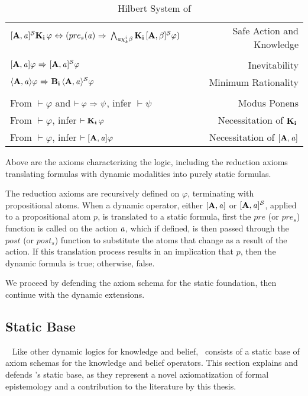 \begin{table}[H]
\begin{center}
\begin{tabular}{| l r |}
    $\mathbf{[A,\mathit{a}]^\mathcal{S}}\mathbf{K}_{\mathbf{i}}\,\varphi {\ \Leftrightarrow \ } (pre_s(\mathit{a}){\ \Rightarrow \ } \bigwedge_{\mathit{a}\chi_{k}^i\beta}\mathbf{K}_{\mathbf{i}}\,\mathbf{[A,\beta]^\mathcal{S}}\varphi)$ & Safe Action and Knowledge\\
	&\\
    $\mathbf{[A,\mathit{a}]}\varphi {\ \Rightarrow \ } \mathbf{[A,\mathit{a}]^\mathcal{S}}\varphi$ & Inevitability\\
    $\mathbf{\langle A,\mathit{a}\rangle}\varphi {\ \Rightarrow \ } \mathbf{B}_{\mathbf{i}}\,\mathbf{\langle A,\mathit{a}\rangle^\mathcal{S}}\varphi$ & Minimum Rationality\\
    &\\
    From $\vdash \varphi$ and $\vdash \varphi {\ \Rightarrow \ } \psi$, infer $\vdash\psi$ & Modus Ponens\\
    From $\vdash \varphi$, infer $\vdash \mathbf{K}_{\mathbf{i}}\,\varphi$ & Necessitation of $\mathbf{K}_{\mathbf{i}}\,$\\
    From $\vdash \varphi$, infer $\vdash \mathbf{[A,\mathit{a}]}\varphi$ & Necessitation of $\mathbf{[A,\mathit{a}]}$\\
	\hline
\end{tabular}
\caption{Hilbert System of \DASL}
\end{center}
\end{table}

Above are the axioms characterizing the logic, including the reduction axioms translating formulas with dynamic modalities into purely static formulas.

The reduction axioms are recursively defined on $\varphi$, terminating with propositional atoms. When a dynamic operator, either $\mathbf{[A,\mathit{a}]}$ or $\mathbf{[A,\mathit{a}]^\mathcal{S}}$, applied to a propositional atom $p$, is translated to a static formula, first the $pre$ (or $pre_s$) function is called on the action $\mathit{a}$, which if defined, is then passed through the $post$ (or $post_s$) function to substitute the atoms that change as a result of the action. If this translation process results in an implication that $p$, then the dynamic formula is true; otherwise, false.

 We proceed by defending the axiom schema for the static foundation, then continue with the dynamic extensions.

\subsection{Static Base}~\label{static}
Like other dynamic logics for knowledge and belief, \DASL\ consists of a static base of axiom schemas for the knowledge and belief operators. This section explains and defends \DASL's static base, as they represent a novel axiomatization of formal epistemology and a contribution to the literature by this thesis. 

